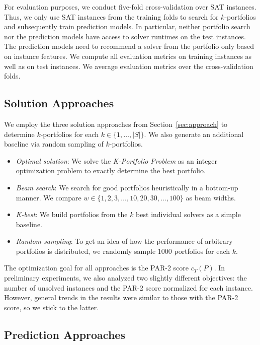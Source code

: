 \documentclass[a4paper,USenglish,pdfa]{lipics-v2021} %
\begin{document}
For evaluation purposes, we conduct five-fold cross-validation over SAT instances.
Thus, we only use SAT instances from the training folds to search for $k$-portfolios and subsequently train prediction models.
In particular, neither portfolio search nor the prediction models have access to solver runtimes on the test instances.
The prediction models need to recommend a solver from the portfolio only based on instance features.
We compute all evaluation metrics on training instances as well as on test instances.
We average evaluation metrics over the cross-validation folds.

\subsection{Solution Approaches}

We employ the three solution approaches from Section~\ref{sec:approach} to determine $k$-portfolios for each $k \in \{1, \dots, |S|\}$. 
We also generate an additional baseline via random sampling of $k$-portfolios.

\begin{itemize}
	\item \emph{Optimal solution}:
	We solve the \emph{K-Portfolio Problem} as an integer optimization problem to exactly determine the best portfolio.
	\item \emph{Beam search}: 
	We search for good portfolios heuristically in a bottom-up manner.
	We compare $w \in \{1, 2, 3, \dots, 10, 20, 30, \dots, 100\}$ as beam widths.
	\item \emph{K-best}:
	We build portfolios from the $k$ best individual solvers as a simple baseline.
	\item \emph{Random sampling}:
	To get an idea of how the performance of arbitrary portfolios is distributed, we randomly sample 1000 portfolios for each $k$.
\end{itemize}

The optimization goal for all approaches is the PAR-2 score $c_T(P)$.
In preliminary experiments, we also analyzed two slightly different objectives:
the number of unsolved instances and the PAR-2 score normalized for each instance.
However, general trends in the results were similar to those with the PAR-2 score, so we stick to the latter.

\subsection{Prediction Approaches}
\end{document}
